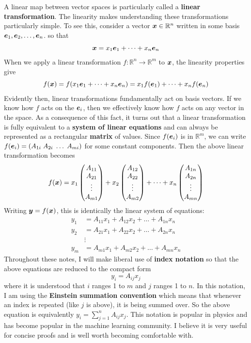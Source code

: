 \documentclass[onecolumn]{gwclass}
\begin{document}
A linear map between vector spaces is particularly called a \textbf{linear transformation}. The linearity makes understanding these transformations particularly simple. To see this, consider a vector $\boldsymbol{x}\in\mathbb{R}^n$ written in some basis $\boldsymbol{e}_1, \boldsymbol{e}_2,\dots, \boldsymbol{e}_n$. so that 
$$ \boldsymbol{x} = x_1 \boldsymbol{e}_1 + \dots + x_n \boldsymbol{e}_n $$
When we apply a linear transformation $f:\mathbb{R}^n\to\mathbb{R}^m$ to $\boldsymbol{x}$, the linearity properties give
$$ f(\boldsymbol{x}) = f(x_1 \boldsymbol{e}_1 + \dots + x_n \boldsymbol{e}_n) =  x_1 f(\boldsymbol{e}_1) + \dots + x_nf(\boldsymbol{e}_n) $$
Evidently then, linear transformations fundamentally act on basis vectors. If we know how $f$ acts on the $\boldsymbol{e}_i$, then we effectively know how $f$ acts on any vector in the space. As a consequence of this fact, it turns out that a linear transformation is fully equivalent to a \textbf{system of linear equations} and can always be represented as a rectangular \textbf{matrix} of values. Since $f(\boldsymbol{e}_i)$ is in $\mathbb{R}^m$, we can write $f(\boldsymbol{e}_i)=(A_{1i}\;A_{2i}\;\dots\;A_{mi})$ for some constant components. Then the above linear transformation becomes 
$$ f(\boldsymbol{x})= x_1\begin{pmatrix}
A_{11}\\A_{21}\\\vdots \\A_{m1}
\end{pmatrix} + x_2\begin{pmatrix}
A_{12}\\A_{22}\\\vdots\\A_{m2}
\end{pmatrix} + \dots + x_n\begin{pmatrix}
A_{1n}\\A_{2n}\\\vdots \\A_{mn}
\end{pmatrix} $$
Writing $\boldsymbol{y}=f(\boldsymbol{x})$, this is identically the linear system of equations:
 \begin{align*}
 	y_1 &= A_{11}x_1 + A_{12}x_2 + \dots + A_{1n}x_n \\
 	y_2 &= A_{21}x_1 + A_{22}x_2 + \dots + A_{2n}x_n \\
 	&\vdots \\
 	y_m &= A_{m1}x_1 + A_{m2}x_2 + \dots + A_{mn}x_n
 \end{align*} 
Throughout these notes, I will make liberal use of \textbf{index notation} so that the above equations are reduced to the compact form
 $$ y_i = A_{ij}x_j  $$
where it is understood that $i$ ranges 1 to $m$ and $j$ ranges 1 to $n$. In this notation, I am using the \textbf{Einstein summation convention} which means that whenever an index is repeated (like $j$ is above), it is being summed over. So the above equation is equivalently $y_i=\sum_{j=1}^nA_{ij}x_j$. This notation is popular in physics and has become popular in the machine learning community. I believe it is very useful for concise proofs and is well worth becoming comfortable with. 
\end{document}
